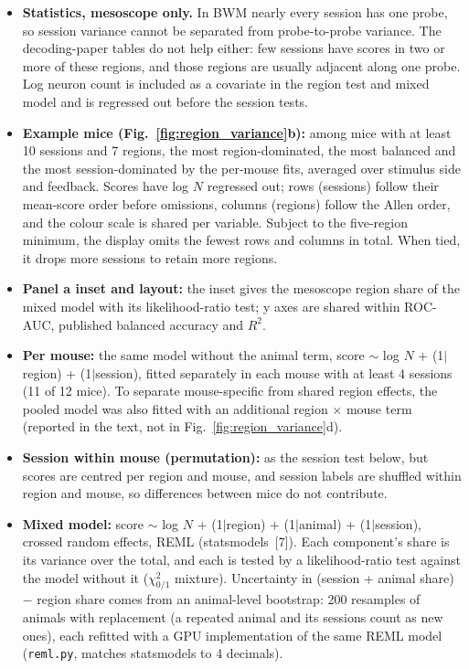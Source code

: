 \documentclass[10pt]{article}
\newcommand{\figref}[1]{Fig.~\ref{fig:#1}}
\begin{document}
\begin{itemize}
  \item \textbf{Statistics, mesoscope only.} In BWM nearly every session has one probe, so session variance cannot be separated from probe-to-probe variance. The decoding-paper tables do not help either: few sessions have scores in two or more of these regions, and those regions are usually adjacent along one probe. Log neuron count is included as a covariate in the region test and mixed model and is regressed out before the session tests.
  \item \textbf{Example mice (\figref{region_variance}b):} among mice with at least 10 sessions and 7 regions, the most region-dominated, the most balanced and the most session-dominated by the per-mouse fits, averaged over stimulus side and feedback. Scores have log $N$ regressed out; rows (sessions) follow their mean-score order before omissions, columns (regions) follow the Allen order, and the colour scale is shared per variable. Subject to the five-region minimum, the display omits the fewest rows and columns in total. When tied, it drops more sessions to retain more regions.
  \item \textbf{Panel a inset and layout:} the inset gives the mesoscope region share of the mixed model with its likelihood-ratio test; y axes are shared within ROC-AUC, published balanced accuracy and $R^2$.
  \item \textbf{Per mouse:} the same model without the animal term, score $\sim$ log $N$ + (1$|$region) + (1$|$session), fitted separately in each mouse with at least 4 sessions (11 of 12 mice). To separate mouse-specific from shared region effects, the pooled model was also fitted with an additional region $\times$ mouse term (reported in the text, not in \figref{region_variance}d).
  \item \textbf{Session within mouse (permutation):} as the session test below, but scores are centred per region and mouse, and session labels are shuffled within region and mouse, so differences between mice do not contribute.
  \item \textbf{Mixed model:} score $\sim$ log $N$ + (1$|$region) + (1$|$animal) + (1$|$session), crossed random effects, REML (statsmodels~[7]). Each component's share is its variance over the total, and each is tested by a likelihood-ratio test against the model without it ($\chi^2_{0/1}$ mixture). Uncertainty in (session + animal share) $-$ region share comes from an animal-level bootstrap: 200 resamples of animals with replacement (a repeated animal and its sessions count as new ones), each refitted with a GPU implementation of the same REML model (\texttt{reml.py}, matches statsmodels to 4 decimals).

\end{itemize}
\end{document}
